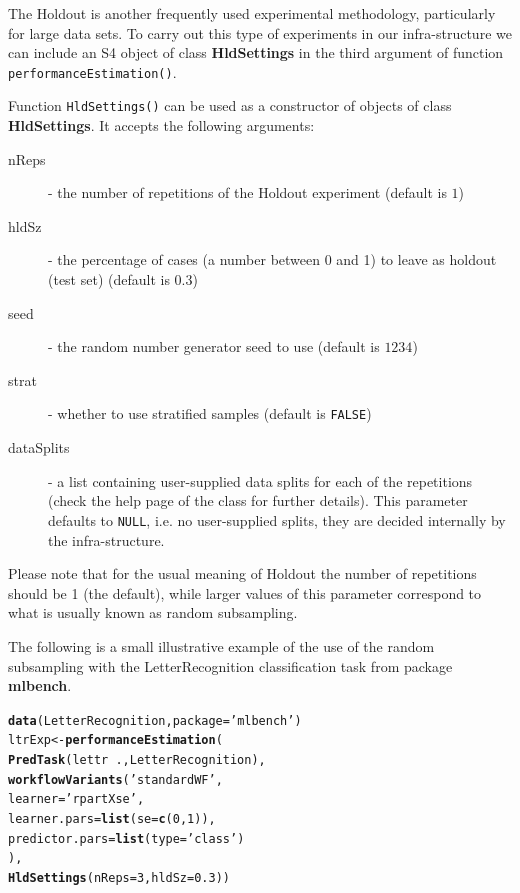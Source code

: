 \documentclass[10pt,a4paper]{article}\usepackage[]{graphicx}\usepackage[]{color}
\makeatletter
\newcommand{\hlnum}[1]{\textcolor[rgb]{0.686,0.059,0.569}{#1}}%
\newcommand{\hlstr}[1]{\textcolor[rgb]{0.192,0.494,0.8}{#1}}%
\newcommand{\hlopt}[1]{\textcolor[rgb]{0,0,0}{#1}}%
\newcommand{\hlstd}[1]{\textcolor[rgb]{0.345,0.345,0.345}{#1}}%
\newcommand{\hlkwb}[1]{\textcolor[rgb]{0.69,0.353,0.396}{#1}}%
\newcommand{\hlkwc}[1]{\textcolor[rgb]{0.333,0.667,0.333}{#1}}%
\newcommand{\hlkwd}[1]{\textcolor[rgb]{0.737,0.353,0.396}{\textbf{#1}}}%
\newenvironment{kframe}{%
 \def\at@end@of@kframe{}%
 \ifinner\ifhmode%
  \def\at@end@of@kframe{\end{minipage}}%
  \begin{minipage}{\columnwidth}%
 \fi\fi%
 \def\FrameCommand##1{\hskip\@totalleftmargin \hskip-\fboxsep
 \colorbox{shadecolor}{##1}\hskip-\fboxsep
     \hskip-\linewidth \hskip-\@totalleftmargin \hskip\columnwidth}%
 \MakeFramed {\advance\hsize-\width
   \@totalleftmargin\z@ \linewidth\hsize
   \@setminipage}}%
 {\par\unskip\endMakeFramed%
 \at@end@of@kframe}
\newenvironment{knitrout}{}{} %
\makeatother
\begin{document}
The Holdout is another frequently used experimental methodology,
particularly for large data sets. To carry out this type of
experiments in our infra-structure we can include an S4 object of
class \textbf{HldSettings} in the third argument of function
\texttt{performanceEstimation()}.

Function \texttt{HldSettings()} can be used as a constructor of
objects of class \textbf{HldSettings}. It accepts the following
arguments:

\begin{description}
\item[nReps] - the number of repetitions of the Holdout experiment (default is $1$)
\item[hldSz] - the percentage  of cases (a number between 0 and 1) to leave as holdout (test set) (default is $0.3$)
\item[seed] - the random number generator seed to use (default is $1234$)
\item[strat] - whether to use stratified samples (default is \texttt{FALSE})
\item[dataSplits] - a list containing user-supplied data splits
  for each of the repetitions (check the help page of the
  class for further details). This parameter defaults to
  \texttt{NULL}, i.e. no user-supplied splits, they are decided
  internally by the infra-structure.
\end{description}

Please note that for the usual meaning of Holdout the number of repetitions should be 1 (the default), while larger values of this parameter correspond to what is usually known as random subsampling.

The following is a small illustrative example of the use of the
random subsampling with the LetterRecognition classification task from package
\textbf{mlbench}.

\begin{knitrout}
\color{fgcolor}\begin{kframe}
\begin{alltt}
\hlkwd{data}\hlstd{(LetterRecognition,}\hlkwc{package}\hlstd{=}\hlstr{'mlbench'}\hlstd{)}
\hlstd{ltrExp} \hlkwb{<-} \hlkwd{performanceEstimation}\hlstd{(}
  \hlkwd{PredTask}\hlstd{(lettr} \hlopt{~} \hlstd{.,LetterRecognition),}
  \hlkwd{workflowVariants}\hlstd{(}\hlstr{'standardWF'}\hlstd{,}
           \hlkwc{learner}\hlstd{=}\hlstr{'rpartXse'}\hlstd{,}
           \hlkwc{learner.pars}\hlstd{=}\hlkwd{list}\hlstd{(}\hlkwc{se}\hlstd{=}\hlkwd{c}\hlstd{(}\hlnum{0}\hlstd{,}\hlnum{1}\hlstd{)),}
           \hlkwc{predictor.pars}\hlstd{=}\hlkwd{list}\hlstd{(}\hlkwc{type}\hlstd{=}\hlstr{'class'}\hlstd{)}
           \hlstd{),}
  \hlkwd{HldSettings}\hlstd{(}\hlkwc{nReps}\hlstd{=}\hlnum{3}\hlstd{,}\hlkwc{hldSz}\hlstd{=}\hlnum{0.3}\hlstd{))}
\end{alltt}
\end{kframe}
\end{knitrout}
\end{document}
